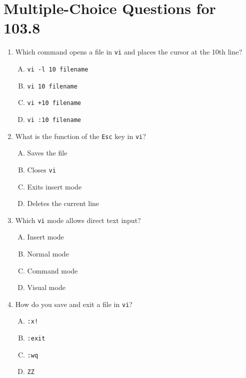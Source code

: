 \documentclass[a4paper]{report}
\begin{document}
\section*{Multiple-Choice Questions for 103.8}
\begin{enumerate}[1.]

    \item Which command opens a file in \texttt{vi} and places the cursor at the 10th line?  
    \begin{enumerate}[A)]
        \item \texttt{vi -l 10 filename}  
        \item \texttt{vi 10 filename}  
        \item \texttt{vi +10 filename}  
        \item \texttt{vi :10 filename}  
    \end{enumerate}

    \item What is the function of the \texttt{Esc} key in \texttt{vi}?  
    \begin{enumerate}[A)]
        \item Saves the file  
        \item Closes \texttt{vi}  
        \item Exits insert mode  
        \item Deletes the current line  
    \end{enumerate}

    \item Which \texttt{vi} mode allows direct text input?  
    \begin{enumerate}[A)]
        \item Insert mode  
        \item Normal mode  
        \item Command mode  
        \item Visual mode  
    \end{enumerate}

    \item How do you save and exit a file in \texttt{vi}?  
    \begin{enumerate}[A)]
        \item \texttt{:x!}  
        \item \texttt{:exit}  
        \item \texttt{:wq}  
        \item \texttt{ZZ}  
    \end{enumerate}


\end{enumerate}
\end{document}
